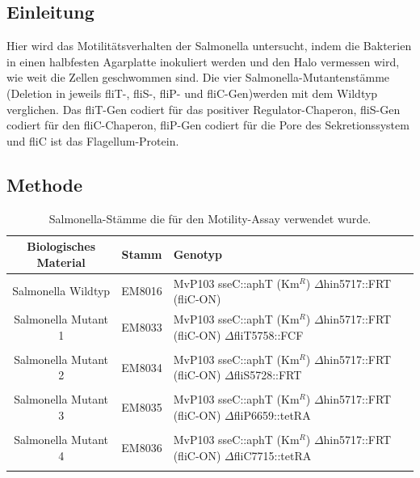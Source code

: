 \documentclass[oneside,10pt,a4paper]{report}
\begin{document}
			\subsection{Einleitung}
			Hier wird das Motilitätsverhalten der Salmonella untersucht, indem die Bakterien in einen halbfesten Agarplatte inokuliert werden und den Halo vermessen wird, wie weit die Zellen geschwommen sind.
			Die vier Salmonella-Mutantenstämme (Deletion in jeweils fliT-, fliS-, fliP- und fliC-Gen)werden mit dem Wildtyp verglichen.
			Das fliT-Gen codiert für das positiver Regulator-Chaperon, fliS-Gen codiert für den fliC-Chaperon, fliP-Gen codiert für die Pore des Sekretionssystem und fliC ist das Flagellum-Protein.
			
			\subsection{Methode}
				\begin{table}[H]
				\centering
				\caption{Salmonella-Stämme die für den Motility-Assay verwendet wurde.}
				\label{tab: exp6-biologisches Material part3}
				\begin{tabular}{ccp{5cm}}
					\toprule
					Biologisches Material& Stamm & Genotyp\\
					\midrule
					\multirow{3}{*}{\parbox[t]{2cm}{Salmonella Wildtyp }}  & \multirow{3}{*}{EM8016} & \multirow{3}{*}{\parbox[t]{4.5cm}{MvP103 sseC::aphT (Km$^R$) $\Delta$hin5717::FRT (fliC-ON)}}\\
					&&\\
					&&\\
					\multirow{3}{*}{\parbox[t]{2cm}{Salmonella Mutant 1}}  & \multirow{3}{*}{EM8033} & \multirow{3}{*}{\parbox[t]{4.5cm}{MvP103 sseC::aphT (Km$^R$) $\Delta$hin5717::FRT (fliC-ON) $\Delta$fliT5758::FCF}}\\
					&&\\
					&&\\
					&&\\
					\multirow{3}{*}{\parbox[t]{2cm}{Salmonella Mutant 2}}  & \multirow{3}{*}{EM8034} & \multirow{3}{*}{\parbox[t]{4.5cm}{MvP103 sseC::aphT (Km$^R$) $\Delta$hin5717::FRT (fliC-ON) $\Delta$fliS5728::FRT}}\\
					&&\\
					&&\\
					&&\\
					\multirow{3}{*}{\parbox[t]{2cm}{Salmonella Mutant 3}} & \multirow{3}{*}{EM8035} &\multirow{3}{*}{\parbox[t]{4.5cm}{MvP103 sseC::aphT (Km$^R$) $\Delta$hin5717::FRT (fliC-ON) $\Delta$fliP6659::tetRA}} \\
					&&\\
					&&\\
					&&\\
					\multirow{3}{*}{\parbox[t]{2cm}{Salmonella Mutant 4}} & \multirow{3}{*}{EM8036} &\multirow{3}{*}{\parbox[t]{4.5cm}{MvP103 sseC::aphT (Km$^R$) $\Delta$hin5717::FRT (fliC-ON) $\Delta$fliC7715::tetRA}} \\
					&&\\
					&&\\
					&&\\
					\bottomrule			
				\end{tabular}
			\end{table}
\end{document}
